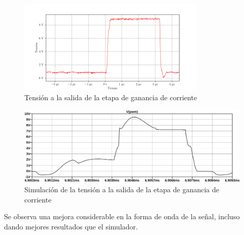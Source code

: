 
\begin{figure}[H]
    \centering
    \includegraphics[width=0.8\textwidth]{images/capturas-osciloscopio/17-11-2022/3.png}
    \caption{Tensión a la salida de la etapa de ganancia de corriente}
    \label{fig:osc:3}
\end{figure}

\begin{figure}[H]
    \centering
    \includegraphics[width=\textwidth]{images/sim/3.pdf}
    \caption{Simulación de la tensión a la salida de la etapa de ganancia de corriente}
    \label{fig:sim:3}
\end{figure}

Se observa una mejora considerable en la forma de onda de la señal, incluso dando mejores resultados que el simulador. %




